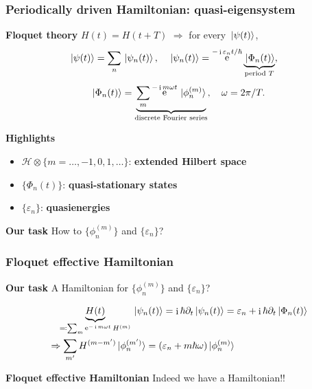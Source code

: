 \documentclass[t]{beamer}
\DeclareMathOperator{\ee}{e}
\DeclareMathOperator{\ii}{i}
\newcommand{\concept}[1]{\textbf{#1}}
\begin{document}
\begin{frame}
\frametitle{Periodically driven Hamiltonian: quasi-eigensystem}

\textbf{Floquet theory} $H(t) = H(t + T)$ $\Rightarrow$ 
for every $\ket*{\psi(t)}$, 
\begin{equation*}
    \begin{aligned}
        &\ket*{\psi(t)} = \sum_n \ket*{\psi_n(t)} , \quad 
        \ket*{\psi_n(t)} = \ee^{- \ii \varepsilon_n t / \hbar} \underbrace{
            \ket*{\Phi_n(t)}
        }_\text{period $T$} ,
    \end{aligned}
\end{equation*}
\begin{equation*}
    \ket*{\Phi_n(t)} = \underbrace{\sum_m \ee^{- \ii m \omega t} \ket*{\phi_n^{(m)}}}_{\text{discrete Fourier series}} , \quad 
    \omega = 2\pi / T. 
\end{equation*}

\textbf{Highlights} 
\begin{itemize}
    \item $\mathcal{H} \otimes \{m= \ldots, -1, 0, 1, \ldots \}$: \concept{extended Hilbert space}
    \item $\{\Phi_n(t)\}$: \concept{quasi-stationary states}
    \item $\{\varepsilon_n\}$: \concept{quasienergies}
\end{itemize}

\vspace{0.5cm}

\textbf{Our task} How to  $\{ \phi_n^{(m)} \}$ and $\{ \varepsilon_n \}$? 

\end{frame}

\begin{frame}
\frametitle{Floquet effective Hamiltonian}

\textbf{Our task} A Hamiltonian for $\{ \phi_n^{(m)} \}$ and $\{ \varepsilon_n \}$? 

\[
    \begin{aligned}
        &\quad 
        \underbrace{H(t)}_{\eqqcolon \sum_m \ee^{- \ii m \omega t} H^{(m)}} \ket*{\psi_n(t)} = \ii \hbar \partial_t \ket*{\psi_n(t)} = \varepsilon_n + \ii \hbar \partial_t \ket*{\Phi_n(t)} \\
        &\Rightarrow \sum_{m'} H^{(m - m')} \ket*{\phi^{(m')}_n} = (\varepsilon_n + m \hbar \omega) \ket*{\phi_n^{(m)}} 
    \end{aligned}
\]

\textbf{Floquet effective Hamiltonian} Indeed we have a Hamiltonian!!


\end{frame}
\end{document}
